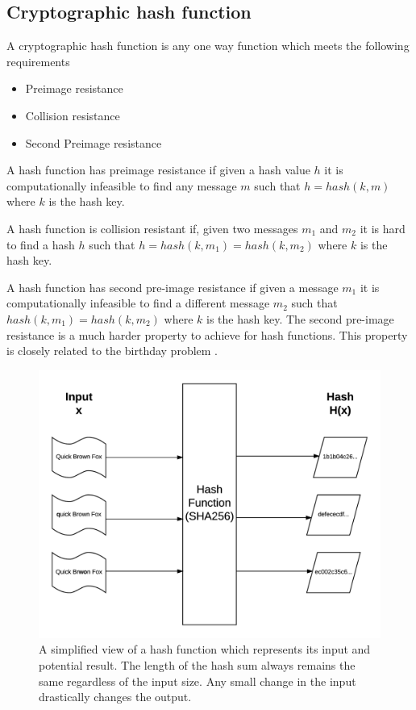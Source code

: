 \documentclass{sig-alternate-05-2015}
\begin{document}
 \subsection{Cryptographic hash function \cite{rogaway_cryptographic_2004}} 
 A cryptographic hash function is any one way function which meets the following requirements 
 \begin{itemize} 
 \item Preimage resistance
 \item Collision resistance
 \item Second Preimage resistance
 \end{itemize}
 
 A hash function has preimage resistance if given a hash value $h$ it is computationally infeasible to find any message $m$ such that $h = hash(k,m)$ where $k$ is the hash key.
 
 A hash function is collision resistant if, given two messages $m_{1}$ and $m_{2}$ it is hard to find a hash $h$ such that $h = hash(k,m_{1}) = hash(k,m_{2})$ where $k$ is the hash key.
 
 A hash function has second pre-image resistance if given a message $m_{1}$ it is computationally infeasible to find a different message  $m_{2}$ such that $hash(k,m_{1}) = hash(k,m_{2})$ where $k$ is the hash key. The second pre-image resistance is a much harder property to achieve for hash functions. This property is closely related to the birthday problem \cite{lesser_exploring_1999}.
 
 \begin{figure}[hbtp]
 \includegraphics[scale=0.55]{hash_function.png}
 \caption{A simplified view of a hash function which represents its input and potential result. The length of the hash sum always remains the same regardless of the input size. Any small change in the input drastically changes the output.}
 \end{figure}
 
\end{document}

